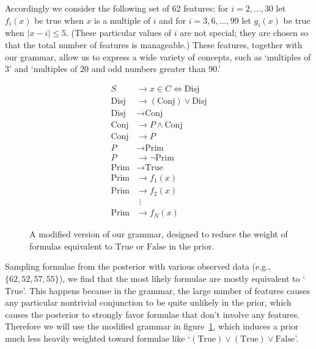 \documentclass[apacite,jou]{apa6}
\newcommand{\Disj}{\text{Disj}}
\newcommand{\Conj}{\text{Conj}}
\newcommand{\True}{\text{True}}
\newcommand{\Prim}{\text{Prim}}
\newcommand{\False}{\text{False}}
\begin{document}
Accordingly we consider the following set of 62 features:
for $i=2,\ldots,30$ let $f_i(x)$ be true when $x$ is a multiple of $i$
and for $i=3,6,\ldots,99$ 
let $g_i(x)$ be true when $|x-i| \leq 5$.
(These particular values of $i$ are not special; they are chosen
so that the total number of features is manageable.)
These features, together with our grammar, allow us to express
a wide variety of concepts, such as `multiples of 3' and
`multiples of 20 and odd numbers greater than 90.' 

\begin{figure}
\begin{align*}
	S &\to x\in C \Leftrightarrow \Disj\\
	\Disj &\to (\Conj) \vee \Disj \\
	\Disj &\to \Conj \\
	\Conj &\to P \wedge \Conj\\
	\Conj &\to P\\
	P &\to \Prim\\
	P &\to \neg\Prim\\
	\Prim &\to \True\\
	\Prim &\to f_1(x)\\
	\Prim &\to f_2(x)\\
	&\,\,\vdots\\
	\Prim &\to f_N(x)
\end{align*}
	\caption{A modified version of our grammar, designed to 
		reduce the weight of formulas equivalent to $\True$
		or $\False$ in the prior.}
	\label{dnf2}
\end{figure}

Sampling formulae from the posterior with various observed data
(e.g., $\{62, 52, 57, 55\}$), we find that the most likely
formulae are mostly equivalent to `$\True$'. This happens because 
in the grammar,
the large number of features causes any particular
nontrivial conjunction
to be quite unlikely in the prior, which causes the posterior to 
strongly favor formulae that don't involve any features.
 Therefore we will use
the modified grammar in figure~\ref{dnf2}, which induces
a prior much less heavily weighted toward formulae like
`$(\True)\vee(\True)\vee\False$'.
\end{document}
